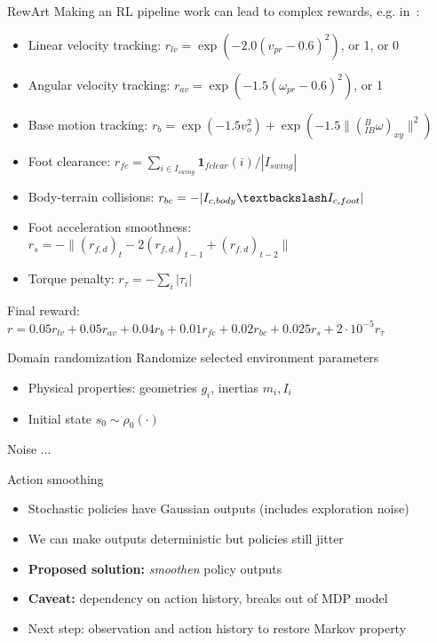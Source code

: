 \documentclass[10pt, aspectratio=1610]{beamer}
\begin{document}
\begin{frame}{RewArt}
    Making an RL pipeline work can lead to complex rewards, e.g. in~\cite{lee2020}:
    \begin{itemize}
        \item Linear velocity tracking: $r_{lv} = \exp(-2.0 (v_{pr} - 0.6)^2)$, or 1, or 0
        \item Angular velocity tracking: $r_{av} = \exp(-1.5 (\omega_{pr} - 0.6)^2)$, or 1
        \item Base motion tracking: $r_b = \exp(-1.5v_o^2) + \exp(-1.5 \|({}^B_{IB} \omega)_{xy}\|^2)$
        \item Foot clearance: $r_{fc} = \sum_{i \in I_{swing}} \mathbf{1}_{fclear}(i) / |I_{swing}|$
        \item Body-terrain collisions: $r_{bc} = -|I_{c,body} \textbackslash I_{c,foot}|$
        \item Foot acceleration smoothness: $r_{s} = -\| (r_{f,d})_t - 2(r_{f,d})_{t-1} + (r_{f,d})_{t-2}\|$
        \item Torque penalty: $r_{\tau} = -\sum_{i} | \tau_i |$
    \end{itemize}
    Final reward: $r = 0.05 r_{lv} + 0.05 r_{av} + 0.04 r_b + 0.01 r_{fc} + 0.02 r_{bc} + 0.025 r_s + 2 \cdot 10^{-5} r_{\tau}$
\end{frame}

\begin{frame}{Domain randomization}
    Randomize selected environment parameters
    \begin{itemize}
        \item Physical properties: geometries $g_i$, inertias $m_i, I_i$
        \item Initial state $s_0 \sim \rho_0(\cdot)$
    \end{itemize}
\end{frame}

\begin{frame}{Noise}
    ...
\end{frame}

\begin{frame}{Action smoothing}
    \begin{itemize}
        \item Stochastic policies have Gaussian outputs (includes exploration noise)
        \item We can make outputs deterministic but policies still jitter
        \item \textbf{Proposed solution:} \emph{smoothen} policy outputs~\cite{peng2020learning}
        \item \textbf{Caveat:} dependency on action history, breaks out of MDP model
        \item Next step: observation and action history to restore Markov property
    \end{itemize}
\end{frame}
\end{document}
